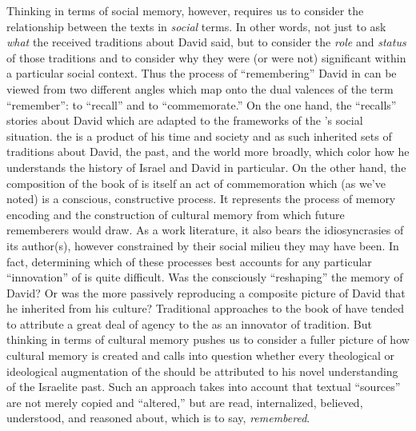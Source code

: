 Thinking in terms of social memory, however, requires us to consider the relationship between the texts in \emph{social} terms. In other words, not just to ask \emph{what} the received traditions about David said, but to consider the \emph{role} and \emph{status} of those traditions and to consider why they were (or were not) significant within a particular social context. Thus the process of ``remembering'' David in \chronicles can be viewed from two different angles which map onto the dual valences of the term ``remember'': to ``recall'' and to ``commemorate.'' On the one hand, the \chronicler ``recalls'' stories about David which are adapted to the frameworks of the \chronicler's social situation. the \chronicler is a product of his time and society and as such inherited sets of traditions about David, the past, and the world more broadly, which color how he understands the history of Israel and David in particular. On the other hand, the composition of the book of \chronicles is itself an act of commemoration which (as we've noted) is a conscious, constructive process. It represents the process of memory encoding and the construction of cultural memory from which future rememberers would draw. As a work literature, it also bears the idiosyncrasies of its author(s), however constrained by their social milieu they may have been. In fact, determining which of these processes best accounts for any particular ``innovation'' of \chronicles is quite difficult. Was the \chronicler consciously ``reshaping'' the memory of David? Or was the \chronicler more passively reproducing a composite picture of David that he inherited from his culture? Traditional approaches to the book of \chronicles have tended to attribute a great deal of agency to the \chronicler as an innovator of tradition. But thinking in terms of cultural memory pushes us to consider a fuller picture of how cultural memory is created and calls into question whether every theological or ideological augmentation of the \chronicler should be attributed to his novel understanding of the Israelite past. Such an approach takes into account that textual ``sources'' are not merely copied and ``altered,'' but are read, internalized, believed, understood, and reasoned about, which is to say, \emph{remembered}.